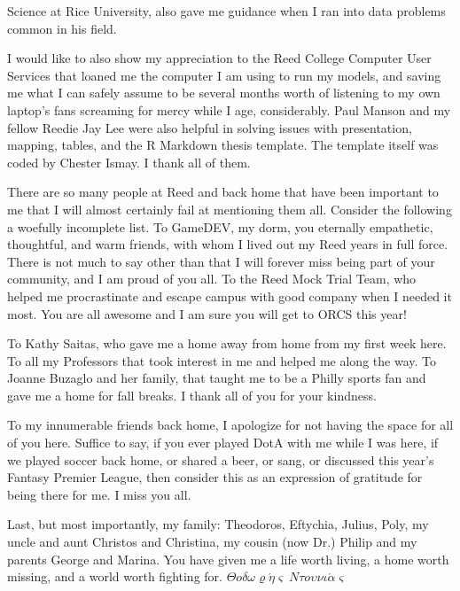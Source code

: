 \documentclass[12pt,twoside]{reedthesis}
\begin{document}
\begin{preface}
      Science at Rice University, also gave me guidance when I ran into data
      problems common in his field. \par I would like to also show my
      appreciation to the Reed College Computer User Services that loaned me
      the computer I am using to run my models, and saving me what I can
      safely assume to be several months worth of listening to my own laptop's
      fans screaming for mercy while I age, considerably. Paul Manson and my
      fellow Reedie Jay Lee were also helpful in solving issues with
      presentation, mapping, tables, and the R Markdown thesis template. The
      template itself was coded by Chester Ismay. I thank all of them.
      \par There are so many people at Reed and back home that have been
      important to me that I will almost certainly fail at mentioning them
      all. Consider the following a woefully incomplete list. To GameDEV, my
      dorm, you eternally empathetic, thoughtful, and warm friends, with whom
      I lived out my Reed years in full force. There is not much to say other
      than that I will forever miss being part of your community, and I am
      proud of you all. To the Reed Mock Trial Team, who helped me
      procrastinate and escape campus with good company when I needed it most.
      You are all awesome and I am sure you will get to ORCS this year!
      \par To Kathy Saitas, who gave me a home away from home from my first
      week here. To all my Professors that took interest in me and helped me
      along the way. To Joanne Buzaglo and her family, that taught me to be a
      Philly sports fan and gave me a home for fall breaks. I thank all of you
      for your kindness. \par To my innumerable friends back home, I apologize
      for not having the space for all of you here. Suffice to say, if you
      ever played DotA with me while I was here, if we played soccer back
      home, or shared a beer, or sang, or discussed this year's Fantasy
      Premier League, then consider this as an expression of gratitude for
      being there for me. I miss you all. \par Last, but most importantly, my
      family: Theodoros, Eftychia, Julius, Poly, my uncle and aunt Christos
      and Christina, my cousin (now Dr.) Philip and my parents George and
      Marina. You have given me a life worth living, a home worth missing, and
      a world worth fighting for.
      \(\Theta o \delta \omega \varrho\acute\eta\varsigma~N\tau o\upsilon \nu \iota \acute{\alpha}\varsigma\)
      \par
    \end{preface}
  
\end{document}
